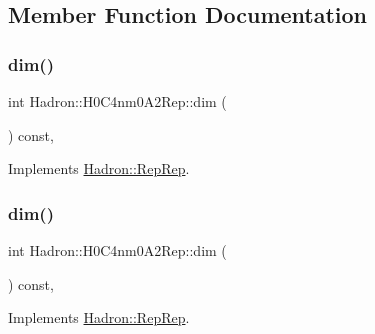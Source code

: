 \subsection{Member Function Documentation}
\mbox{\label{structHadron_1_1H0C4nm0A2Rep_af71f480dfcc57dc4f7f0a03da6dd70d7}} 
\subsubsection{\texorpdfstring{dim()}{dim()}\hspace{0.1cm}{\footnotesize\ttfamily [1/5]}}
{\footnotesize\ttfamily int Hadron\+::\+H0\+C4nm0\+A2\+Rep\+::dim (\begin{DoxyParamCaption}{ }\end{DoxyParamCaption}) const\hspace{0.3cm}{\ttfamily [inline]}, {\ttfamily [virtual]}}



Implements \mbox{\hyperlink{structHadron_1_1RepRep_a92c8802e5ed7afd7da43ccfd5b7cd92b}{Hadron\+::\+Rep\+Rep}}.

\mbox{\label{structHadron_1_1H0C4nm0A2Rep_af71f480dfcc57dc4f7f0a03da6dd70d7}} 
\subsubsection{\texorpdfstring{dim()}{dim()}\hspace{0.1cm}{\footnotesize\ttfamily [2/5]}}
{\footnotesize\ttfamily int Hadron\+::\+H0\+C4nm0\+A2\+Rep\+::dim (\begin{DoxyParamCaption}{ }\end{DoxyParamCaption}) const\hspace{0.3cm}{\ttfamily [inline]}, {\ttfamily [virtual]}}



Implements \mbox{\hyperlink{structHadron_1_1RepRep_a92c8802e5ed7afd7da43ccfd5b7cd92b}{Hadron\+::\+Rep\+Rep}}.

\mbox{\label{structHadron_1_1H0C4nm0A2Rep_af71f480dfcc57dc4f7f0a03da6dd70d7}} 

